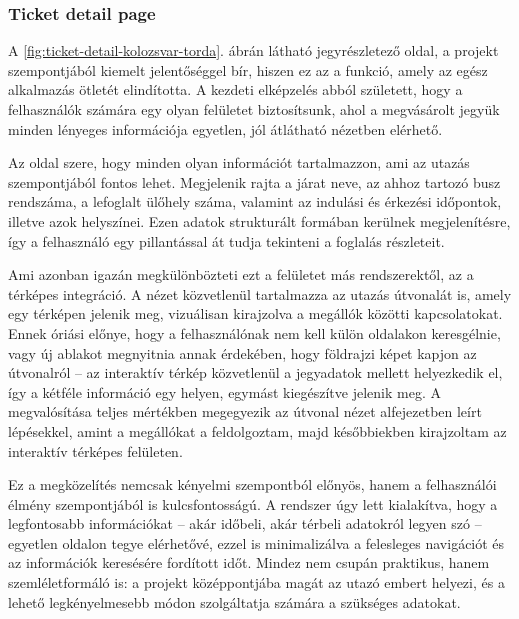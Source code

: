 \subsubsection{Ticket detail page }

A  \ref{fig:ticket-detail-kolozsvar-torda}. ábrán látható jegyrészletező oldal, a projekt szempontjából kiemelt jelentőséggel bír, hiszen ez az a funkció, amely az egész alkalmazás ötletét elindította. A kezdeti elképzelés abból született, hogy a felhasználók számára egy olyan felületet biztosítsunk, ahol a megvásárolt jegyük minden lényeges információja egyetlen, jól átlátható nézetben elérhető.

Az oldal szere, hogy minden olyan információt tartalmazzon, ami az utazás szempontjából fontos lehet. Megjelenik rajta a járat neve, az ahhoz tartozó busz rendszáma, a lefoglalt ülőhely száma, valamint az indulási és érkezési időpontok, illetve azok helyszínei. Ezen adatok strukturált formában kerülnek megjelenítésre, így a felhasználó egy pillantással át tudja tekinteni a foglalás részleteit.

Ami azonban igazán megkülönbözteti ezt a felületet más rendszerektől, az a térképes integráció. A nézet közvetlenül tartalmazza az utazás útvonalát is, amely egy térképen jelenik meg, vizuálisan kirajzolva a megállók közötti kapcsolatokat. Ennek óriási előnye, hogy a felhasználónak nem kell külön oldalakon keresgélnie, vagy új ablakot megnyitnia annak érdekében, hogy földrajzi képet kapjon az útvonalról – az interaktív térkép közvetlenül a jegyadatok mellett helyezkedik el, így a kétféle információ egy helyen, egymást kiegészítve jelenik meg. A megvalósítása teljes mértékben megegyezik az útvonal nézet alfejezetben leírt lépésekkel, amint a megállókat a feldolgoztam, majd későbbiekben kirajzoltam az interaktív térképes felületen.

Ez a megközelítés nemcsak kényelmi szempontból előnyös, hanem a felhasználói élmény szempontjából is kulcsfontosságú. A rendszer úgy lett kialakítva, hogy a legfontosabb információkat – akár időbeli, akár térbeli adatokról legyen szó – egyetlen oldalon tegye elérhetővé, ezzel is minimalizálva a felesleges navigációt és az információk keresésére fordított időt. Mindez nem csupán praktikus, hanem szemléletformáló is: a projekt középpontjába magát az utazó embert helyezi, és a lehető legkényelmesebb módon szolgáltatja számára a szükséges adatokat.

